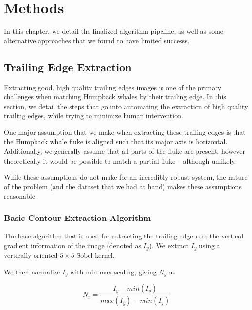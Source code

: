   
\chapter{Methods} \label{sec:methods}

In this chapter, we detail the finalized algorithm pipeline, as well as some alternative approaches that we found to have limited successs.

\section{Trailing Edge Extraction}

Extracting good, high quality trailing edges images is one of the primary challenges when matching Humpback whales by their trailing edge.
In this section, we detail the steps that go into automating the extraction of high quality trailing edges, while trying to minimize human intervention.

One major assumption that we make when extracting these trailing edges is that the Humpback whale fluke is aligned such that its major axis is horizontal.
Additionally, we generally assume that all parts of the fluke are present, however theoretically it would be possible to match a partial fluke -- although unlikely.

While these assumptions do not make for an incredibly robust system, the nature of the problem (and the dataset that we had at hand) makes these assumptions reasonable.

\subsection{Basic Contour Extraction Algorithm}

The base algorithm that is used for extracting the trailing edge uses the vertical gradient information of the image (denoted as $I_y$).
We extract $I_y$ using a vertically oriented $5 \times 5$ Sobel kernel\cite{Sobel1968}.  

We then normalize $I_y$ with min-max scaling, giving $N_y$ as

\begin{equation} \label{norm01}
N_{y} = \frac{I_y - min(I_y)}{max(I_y) - min(I_y)}
\end{equation}

